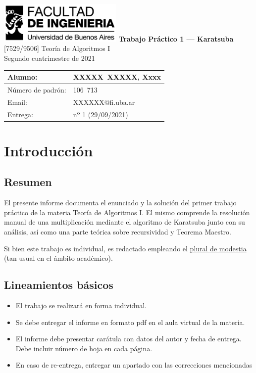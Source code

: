 \documentclass[titlepage,a4paper]{article}
\begin{document}
\begin{titlepage} %
	\hfill\includegraphics[width=6cm]{logofiuba.jpg}
    \centering
    \vfill
    \Huge \textbf{Trabajo Práctico 1 — Karatsuba}
    \vskip2cm
    \Large [7529/9506] Teoría de Algoritmos I\\
    Segundo cuatrimestre de 2021
    \vfill
    \begin{tabular}{ | l | l | } %
      \hline
      Alumno: & XXXXX~XXXXX, Xxxx \\ \hline
      Número de padrón: & 106~713 \\ \hline
      Email: & XXXXXX@fi.uba.ar \\ \hline
      Entrega: & nº 1 (29/09/2021) \\ \hline
  	\end{tabular}
    \vfill
    \vfill
\end{titlepage}

\tableofcontents %
\newpage

\section{Introducción}\label{sec:intro}
\subsection{Resumen}
El presente informe documenta el enunciado y la solución del primer trabajo práctico de la materia Teoría de Algoritmos I. El mismo comprende la resolución manual de una multiplicación mediante el algoritmo de Karatsuba junto con su análisis, así como una parte teórica sobre recursividad y Teorema Maestro.

Si bien este trabajo es individual, es redactado empleando el \href{http://aplica.rae.es/grweb/cgi-bin/v.cgi?i=OnqaThAvcEUygoXO}{plural de modestia} (tan usual en el ámbito académico).

\subsection{Lineamientos básicos}
\begin{itemize}
\item El trabajo se realizará en forma individual.

\item Se debe entregar el informe en formato pdf en el aula virtual de la materia.

\item El informe debe presentar carátula con datos del autor y fecha de entrega. Debe incluir número de hoja en cada página.

\item En caso de re-entrega, entregar un apartado con las correcciones mencionadas
\end{itemize}
\end{document}
